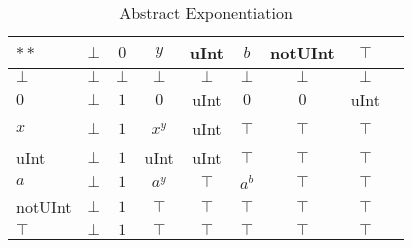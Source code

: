 \begin{table}[htbp]
\centering
\begin{tabular}{l|cccccccc}
$**$    & $\bot$ & $0$    & $y$    & uInt   & $b$    & notUInt & $\top$ \\\hline
$\bot$  & $\bot$ & $\bot$ & $\bot$ & $\bot$ & $\bot$ & $\bot$  & $\bot$ \\
$0$     & $\bot$ & $1$    & $0$    & uInt   & $0$    & $0$     & uInt   \\
$x$     & $\bot$ & $1$    & $x^y$  & uInt   & $\top$ & $\top$  & $\top$ \\
uInt    & $\bot$ & $1$    & uInt   & uInt   & $\top$ & $\top$  & $\top$ \\
$a$     & $\bot$ & $1$    & $a^y$  & $\top$ & $a^b$  & $\top$  & $\top$ \\
notUInt & $\bot$ & $1$    & $\top$ & $\top$ & $\top$ & $\top$  & $\top$ \\
$\top$  & $\bot$ & $1$    & $\top$ & $\top$ & $\top$ & $\top$  & $\top$    
\end{tabular}
\caption{Abstract Exponentiation}
\label{tab:abstract_exponentiation}
\end{table}
